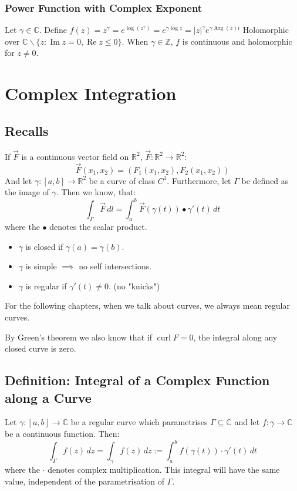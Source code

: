 \subsubsection{Power Function with Complex Exponent}
Let $\gamma \in \mathbb{C}$. Define $f(z)=z^\gamma = e^{\log(z^\gamma)}=e^{\gamma \log z}=|z|^\gamma e^{\gamma \operatorname{Arg}(z)i}$  Holomorphic over $\mathbb{C}\backslash \{z:\operatorname{Im}z=0,\operatorname{Re}z\le 0\}$.
When $\gamma \in \mathbb Z$, $f$ is continuous and holomorphic for $z\ne 0$.

\section{Complex Integration}

\subsection{Recalls}
If $\vec F$ is a continuous vector field on $\mathbb R^2$, $\vec F :\mathbb R^2 \to\mathbb R^2$:
$$
\vec F(x_1,x_2)=(F_1(x_1,x_2),F_2(x_1,x_2))
$$ And let $\gamma:[a,b]\to \mathbb R^2$ be a curve of class $C^1$. Furthermore, let $\Gamma$ be defined as the image of $\gamma$. Then we know, that:
$$
\int_\Gamma \vec F \, dl = \int_a^b \vec F(\gamma(t))\bullet \gamma' (t) \,dt
$$
where the $\bullet$ denotes the scalar product.
\begin{itemize}
	\item $\gamma$ is closed if $\gamma(a)=\gamma(b)$.
	\item $\gamma$ is simple $\implies$  no self intersections.
	\item $\gamma$ is regular if $\gamma'(t)\ne0$. (no "knicks")
\end{itemize}
For the following chapters, when we talk about curves, we always mean regular curves.

By Green's theorem we also know that if $\operatorname{curl} F = 0$, the integral along any closed curve is zero.

\subsection{Definition: Integral of a Complex Function along a Curve}
Let $\gamma : [a,b]\to\mathbb C$ be a regular curve which parametrises $\Gamma \subseteq \mathbb C$ and let $f:\gamma \to \mathbb C$ be a continuous function.
Then:
\begin{equation*}
	\int_\Gamma f(z)\,dz  = \int_\gamma f(z)\,dz := \int_a^b f(\gamma(t))\cdot \gamma'(t)\,dt
\end{equation*}
where the $\cdot$ denotes complex multiplication.
This integral will have the same value, independent of the parametrisation of $\Gamma$.



